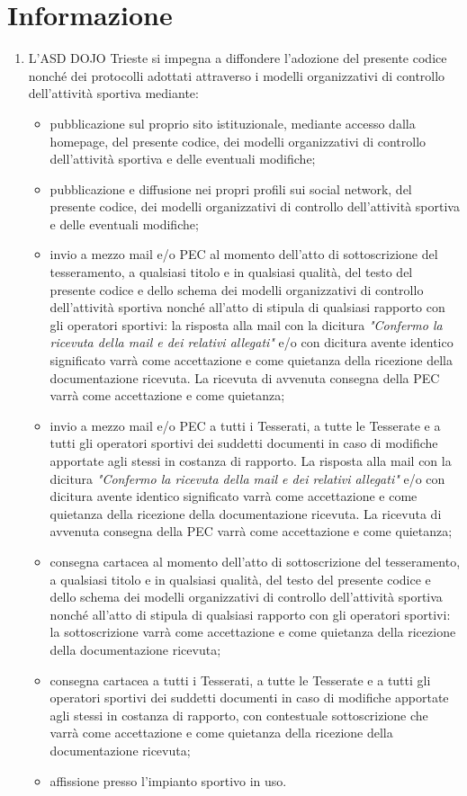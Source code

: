 \documentclass{djtsdoc}
\begin{document}
	\section{Informazione}
	\begin{enumerate}
		\item L'ASD DOJO Trieste si impegna a diffondere l'adozione del presente codice nonché dei protocolli adottati attraverso i modelli organizzativi di controllo dell'attività sportiva mediante:
		\begin{itemize}
			\item pubblicazione sul proprio sito istituzionale, mediante accesso dalla homepage, del presente	codice, dei modelli organizzativi di controllo dell'attività sportiva e delle eventuali modifiche;
			\item pubblicazione e diffusione nei propri profili sui social network, del presente codice, dei	modelli organizzativi di controllo dell'attività sportiva e delle eventuali modifiche;
			\item invio a mezzo mail e/o PEC al momento dell'atto di sottoscrizione del tesseramento, a	qualsiasi titolo e in qualsiasi qualità, del testo del presente codice e dello schema dei modelli	organizzativi di controllo dell'attività sportiva nonché all'atto di stipula di qualsiasi rapporto	con gli operatori sportivi: la risposta alla mail con la dicitura \textit{"Confermo la ricevuta della mail e dei relativi allegati"} e/o con dicitura avente identico significato varrà come accettazione e	come quietanza della ricezione della documentazione ricevuta. La ricevuta di avvenuta	consegna della PEC varrà come accettazione e come quietanza;
			\item invio a mezzo mail e/o PEC a tutti i Tesserati, a tutte le Tesserate e a tutti gli operatori sportivi dei suddetti documenti in caso di modifiche apportate agli stessi in costanza di	rapporto. La risposta alla mail con la dicitura \textit{"Confermo la ricevuta della mail e dei relativi allegati"} e/o con dicitura avente identico significato varrà come accettazione e come quietanza della ricezione della documentazione ricevuta. La ricevuta di avvenuta consegna della PEC varrà come accettazione e come quietanza;
			\item consegna cartacea al momento dell'atto di sottoscrizione del tesseramento, a qualsiasi titolo e in qualsiasi qualità, del testo del presente codice e dello schema dei modelli organizzativi di 	controllo dell'attività sportiva nonché all'atto di stipula di qualsiasi rapporto con gli operatori 	sportivi: la sottoscrizione varrà come accettazione e come quietanza della ricezione della 	documentazione ricevuta;
			\item consegna cartacea a tutti i Tesserati, a tutte le Tesserate e a tutti gli operatori sportivi dei	suddetti documenti in caso di modifiche apportate agli stessi in costanza di rapporto, con	contestuale sottoscrizione che varrà come accettazione e come quietanza della ricezione della 	documentazione ricevuta;
			\item affissione presso l'impianto sportivo in uso.
		\end{itemize}
	\end{enumerate}
	
\end{document}
